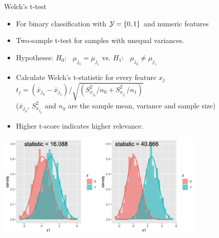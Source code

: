 \documentclass[11pt,compress,t,notes=noshow, xcolor=table]{beamer}
\begin{document}

  \begin{vbframe}{Welch's \MakeLowercase{t}-test}
  \begin{itemize}
  \setlength{\itemsep}{0.6em}
    \item For binary classification with $\mathcal{Y} = \{ 0, 1\}$ and numeric features
    \item Two-sample t-test for samples with unequal variances.
   \item Hypotheses:
    $H_0$: $\;\;\mu_{j_0} = \mu_{j_1} $ \qquad vs. \qquad $H_1$: $\;\;\mu_{j_0} \neq \mu_{j_1}$

    \item Calculate Welch's t-statistic for every feature $x_j$
    $ t_j = (\bar{x}_{j_0} - \bar{x}_{j_1})/ \sqrt{(S^2_{x_{j_0}}/n_0 + S^2_{x_{j_1}}/n_1)}$\\
    ($\bar{x}_{j_y}$, $S^2_{x_{j_{y}}}$ and $n_y$ are the sample mean, %
    variance and sample size)
    \item Higher t-score indicates higher relevance.
  \end{itemize}
\vspace{-0.1cm}
  \begin{center}
\includegraphics[width=0.75\textwidth]{figure/fs-t-test.png}
  \end{center}
  
  \end{vbframe}
\end{document}
